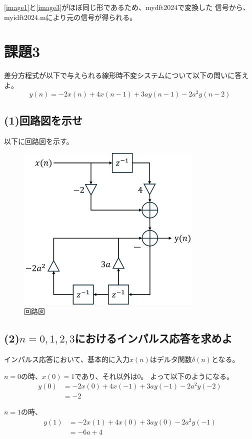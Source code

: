 \documentclass[a4paper,11pt]{ltjsarticle}
\begin{document}
\ref{image1}と\ref{image3}がほぼ同じ形であるため、mydft2024で変換した
信号から、myidft2024.mにより元の信号が得られる。

\section*{課題3}
差分方程式が以下で与えられる線形時不変システムについて以下の問いに答えよ。
\begin{equation*}
	y(n) = -2x(n) + 4x(n-1) + 3ay(n-1) - 2a^{2}y(n-2)
\end{equation*}
\subsection*{(1)回路図を示せ}

以下に回路図を示す。
\begin{figure}[H]
\begin{center}
\includegraphics*[height = 8cm]{DSP1/R2_3_1.png}
\caption{回路図}
\end{center}
\end{figure}

\subsection*{(2)$n=0,1,2,3$におけるインパルス応答を求めよ}
インパルス応答において、基本的に入力$x(n)$はデルタ関数$\delta (n)$となる。

$n=0$の時、$x(0) = 1$であり、それ以外は0。
よって以下のようになる。
\begin{align*}
	y(0) &= -2x(0) + 4x(-1) + 3ay(-1) - 2a^{2}y(-2) \\
	&= -2
\end{align*}

$n = 1$の時、
\begin{align*}
	y(1) &= -2x(1) + 4x(0) + 3ay(0) - 2a^{2}y(-1) \\
	&= -6a + 4
\end{align*}
\end{document}
